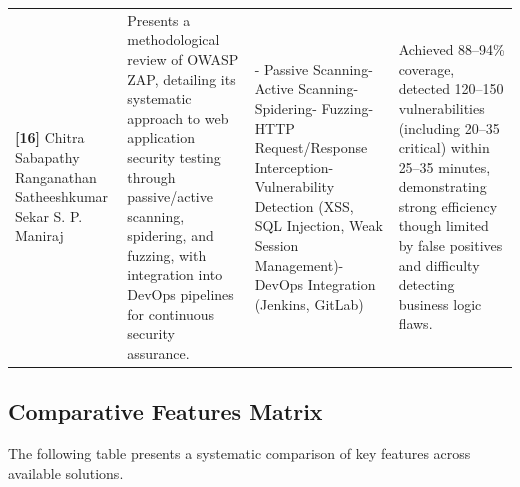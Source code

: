 \begin{scriptsize}
\begin{longtable}{|p{1.8cm}|p{4.2cm}|p{4.0cm}|p{3.8cm}|}
\textbf{[16]} Chitra Sabapathy Ranganathan Satheeshkumar Sekar S. P. Maniraj & Presents a methodological review of OWASP ZAP, detailing its systematic approach to web application security testing through passive/active scanning, spidering, and fuzzing, with integration into DevOps pipelines for continuous security assurance. & - Passive Scanning\newline - Active Scanning\newline - Spidering\newline - Fuzzing\newline - HTTP Request/Response Interception\newline - Vulnerability Detection (XSS, SQL Injection, Weak Session Management)\newline - DevOps Integration (Jenkins, GitLab) & Achieved 88--94\% coverage, detected 120--150 vulnerabilities (including 20--35 critical) within 25--35 minutes, demonstrating strong efficiency though limited by false positives and difficulty detecting business logic flaws. \\

\end{longtable}
\end{scriptsize}

\clearpage
\subsection{Comparative Features Matrix}

The following table presents a systematic comparison of key features across available solutions.

